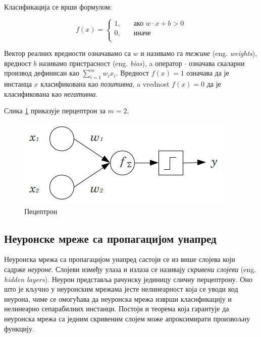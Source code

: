 \documentclass[a4paper]{article}
\begin{document}
Класификација се врши формулом:

\[ f(x) =
  \begin{cases}
    1,      & \quad \text{ако } w \cdot x + b > 0\\
    0,      & \quad \text{иначе } \\
  \end{cases}
\]

Вектор реалних вредности означавамо са $w$ и називамо га \textit{тежине} (eng. \textit{weights}), вредност $b$ називамо пристрасност (eng. \textit{bias}),
a оператор $\cdot$ означава скаларни производ дефинисан као $\sum_{i=1}^m w_ix_i$.
Вредност $f(x) = 1$ означава да је инстанца $x$ класификована као \textit{позитивна}, a vrednost $f(x) = 0$ да је класификована
као \textit{негативна}.


Слика \ref{fig:perceptron} приказује перцептрон за $m=2$.

\begin{figure}[h!]
\begin{center}
    \includegraphics[scale=0.5]{./resources/perceptron.png}
\end{center}
\caption{Пецептрон}
\label{fig:perceptron}
\end{figure}

\subsection{Неуронске мреже са пропагацијом унапред}
Неуронска мрежа са пропагацијом унапред састоји се из више слојева који садрже \textit{неуроне}. Слојеви између улаза
и излаза се називају \textit{скривени слојеви} (eng. \textit{hidden layers}). Неурон представља
рачунску јединицу сличну перцептрону. Оно што је кључно у неуронским мрежама јесте нелинеарност која се уводи
код неурона, чиме се омогућава да неуронска мрежа изврши класификацију и нелинеарно сепарабилних инстанци.
Постоји и теорема која гарантује да неуронска мрежа са једним скривеним слојем може апроксимирати произвољну функцију.
\end{document}
